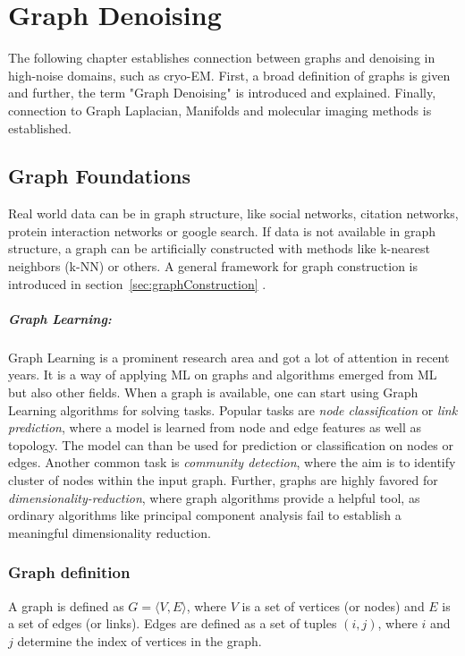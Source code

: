 \chapter{Graph Denoising}
\label{sec:graphFoundations}
    

The following chapter establishes connection between graphs and denoising in high-noise 
domains, such as cryo-EM.
First, a broad definition of graphs is given and further, the term "Graph Denoising" is
introduced and explained. Finally, connection to Graph Laplacian, Manifolds and molecular imaging methods is established.

\section{Graph Foundations}
Real world data can be in graph structure, like social networks, citation networks,
protein interaction networks or google search. 
If data is not available in graph structure, a graph can be artificially constructed with methods like k-nearest neighbors (k-NN) or others.
A general framework for graph construction is introduced in section~\ref{sec:graphConstruction} \textit{}.

\paragraph{Graph Learning:} Graph Learning is a prominent research area and got a lot of attention in recent years.
It is a way of applying ML on graphs and algorithms emerged from ML but also other fields.
When a graph is available, one can start using Graph Learning algorithms for solving tasks.
Popular tasks are \textit{node classification} or \textit{link prediction}, where a model is learned from node and edge features 
as well as topology. The model can than be used for prediction or classification on nodes or edges.
Another common task is \textit{community detection}, where the aim is to identify cluster of nodes within the input graph.
Further, graphs are highly favored for \textit{dimensionality-reduction}, where 
graph algorithms provide a helpful tool, as ordinary algorithms like principal component analysis fail to 
establish a meaningful dimensionality reduction.

\subsection{Graph definition}
A graph is defined as $G = \langle V,E \rangle$, where $V$ is a set of 
vertices (or nodes) and $E$ is a set of edges (or links). 
Edges are defined as a set of tuples $(i, j)$, where $i$ and $j$ determine 
the index of vertices in the graph.


